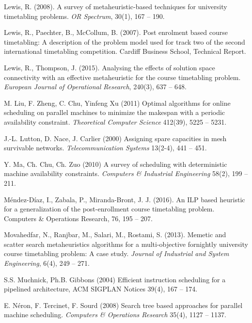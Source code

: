 \documentclass[11pt]{article}
\begin{document}
\begin{thebibliography}{19}
Lewis, R. (2008). 
A survey of metaheuristic-based techniques for university timetabling problems. 
\textit{OR Spectrum}, 30(1), 167 -- 190.

Lewis, R., Paechter, B., McCollum, B. (2007). 
Post enrolment based course timetabling: A description of the problem model used for track two of the second international timetabling competition. 
Cardiff Business School, Technical Report.

Lewis, R., Thompson, J. (2015). 
Analysing the effects of solution space connectivity with an effective metaheuristic for the course timetabling problem. 
\textit{European Journal of Operational Research}, 240(3), 637 -- 648.

M. Liu, F. Zheng, C. Chu, Yinfeng Xu (2011) 
Optimal algorithms for online scheduling on parallel machines to minimize the makespan with a periodic availability constraint. 
\textit{Theoretical Computer Science} 412(39), 5225 -- 5231.

J.-L. Lutton, D. Nace, J. Carlier (2000) 
Assigning spare capacities in mesh survivable networks. 
\textit{Telecommunication Systems} 13(2-4), 441 -- 451.

Y. Ma, Ch. Chu, Ch. Zuo (2010) 
A survey of scheduling with deterministic machine availability constraints. 
\textit{Computers \& Industrial Engineering} 58(2), 199 -- 211.

Méndez-Díaz, I., Zabala, P., Miranda-Bront, J. J. (2016). 
An ILP based heuristic for a generalization of the post-enrollment course timetabling problem. 
Computers \& Operations Research, 76, 195 -- 207.

Movahedfar, N., Ranjbar, M., Salari, M., Rostami, S. (2013). 
Memetic and scatter search metaheuristics algorithms for a multi-objective fornightly university course timetabling problem: A case study. \textit{Journal of Industrial and System Engineering}, 6(4), 249 -- 271.

S.S. Muchnick, Ph.B. Gibbons (2004) 
Efficient instruction scheduling for a pipelined architecture, ACM SIGPLAN Notices 39(4), 167 -- 174.

E. Néron, F. Tercinet, F. Sourd (2008) Search tree based approaches for parallel machine scheduling. 
\textit{Computers \& Operations Research} 35(4), 1127 -- 1137.


\end{thebibliography}
\end{document}
